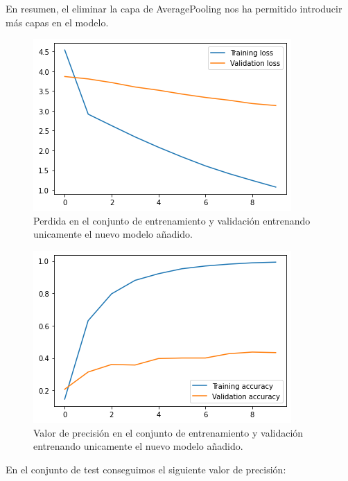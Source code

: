 \documentclass[12pt, spanish]{article}
\begin{document}
En resumen, el eliminar la capa de AveragePooling nos ha permitido introducir más capas en el modelo.


\begin{figure}[H]
  \centering
      \includegraphics[width=\textwidth]{3-1-b-1.png}
 		\caption{Perdida en el conjunto de entrenamiento y validación entrenando unicamente el nuevo modelo añadido.}
\end{figure}

\begin{figure}[H]
  \centering
      \includegraphics[width=\textwidth]{3-1-b-2.png}
 		\caption{Valor de precisión en el conjunto de entrenamiento y validación entrenando unicamente el nuevo modelo añadido.}
\end{figure}



En el conjunto de test conseguimos el siguiente valor de precisión:
\end{document}
